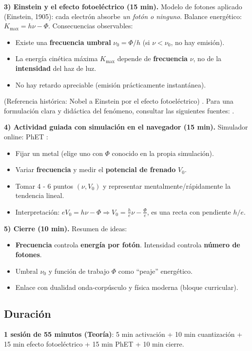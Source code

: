 \documentclass[11pt,a4paper]{article}
\begin{document}
\textbf{3) Einstein y el efecto fotoeléctrico (15 min).} Modelo de fotones aplicado (Einstein, 1905): cada electrón absorbe \emph{un fotón o ninguno}. Balance energético: $K_{\max}=h\nu-\Phi$.
Consecuencias observables:
\begin{itemize}
  \item Existe una \textbf{frecuencia umbral} $\nu_0=\Phi/h$ (si $\nu<\nu_0$, no hay emisión).
  \item La energía cinética máxima $K_{\max}$ depende de \textbf{frecuencia} $\nu$, no de la \textbf{intensidad} del haz de luz.
  \item No hay retardo apreciable (emisión prácticamente instantánea).
\end{itemize}
(Referencia histórica: Nobel a Einstein por el efecto fotoeléctrico) \cite{Nobel_Einstein1921}. Para una formulación clara y didáctica del fenómeno, consultar las siguientes fuentes: \cite{OpenStax_Photoelectric,Britannica_Photoelectric}.

\textbf{4) Actividad guiada con simulación en el navegador (15 min).} Simulador online: PhET \cite{PhET_Photoelectric}:
\begin{itemize}
  \item Fijar un metal (elige uno con $\Phi$ conocido en la propia simulación).
  \item Variar \textbf{frecuencia} y medir el \textbf{potencial de frenado} $V_0$.
  \item Tomar 4 - 6 puntos $(\nu, V_0)$ y representar mentalmente/rápidamente la tendencia lineal.
  \item Interpretación: $eV_0=h\nu-\Phi \Rightarrow V_0=\frac{h}{e}\nu-\frac{\Phi}{e}$, es una recta con pendiente $h/e$.
\end{itemize}

\textbf{5) Cierre (10 min).} Resumen de ideas:
\begin{itemize}
  \item \textbf{Frecuencia} controla \textbf{energía por fotón}. Intensidad controla \textbf{número de fotones}.
  \item Umbral $\nu_0$ y función de trabajo $\Phi$ como “peaje” energético.
  \item Enlace con dualidad onda-corpúsculo y física moderna (bloque curricular).
\end{itemize}

\subsection*{Duración}
\textbf{1 sesión de 55 minutos (Teoría)}:
5 min activación + 10 min cuantización + 15 min efecto fotoeléctrico + 15 min PhET + 10 min cierre.
\end{document}
